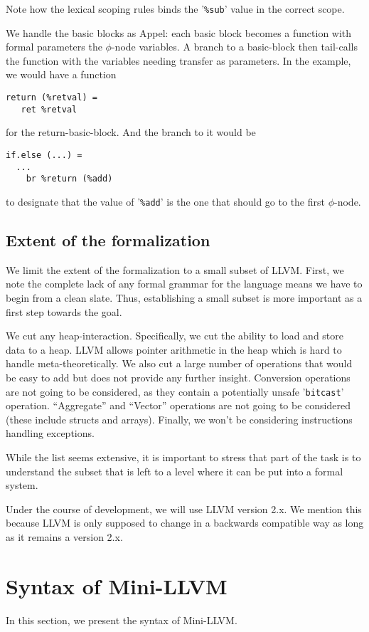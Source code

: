 \documentclass[a4paper, oneside, 10pt, draft]{memoir}
\begin{document}
Note how the lexical scoping rules binds the '\texttt{\%sub}' value
in the correct scope.

We handle the basic blocks as Appel: each basic block becomes a
function with formal parameters the $\phi$-node variables. A branch to
a basic-block then tail-calls the function with the variables needing
transfer as parameters. In the example, we would have a function
\begin{verbatim}
return (%retval) =
   ret %retval
\end{verbatim}
for the return-basic-block. And the branch to it would be
\begin{verbatim}
if.else (...) =
  ...
    br %return (%add)
\end{verbatim}
to designate that the value of '\texttt{\%add}' is the one that should
go to the first $\phi$-node.

\section{Extent of the formalization}

We limit the extent of the formalization to a small subset of
LLVM. First, we note the complete lack of any formal grammar for
the language means we have to begin from a clean slate. Thus,
establishing a small subset is more important as a first step towards
the goal.

We cut any heap-interaction. Specifically, we cut the ability to
load and store data to a heap. LLVM allows pointer arithmetic in the
heap which is hard to handle meta-theoretically. We also cut a large
number of operations that would be easy to add but does not provide
any further insight. Conversion operations are not going to be
considered, as they contain a potentially unsafe '\texttt{bitcast}'
operation. ``Aggregate'' and ``Vector'' operations are not going to be
considered (these include structs and arrays). Finally, we won't be
considering instructions handling exceptions.

While the list seems extensive, it is important to stress that part of
the task is to understand the subset that is left to a level where it
can be put into a formal system.

Under the course of development, we will use LLVM version 2.x. We
mention this because LLVM is only supposed to change in a backwards
compatible way as long as it remains a version 2.x.

\chapter{Syntax of Mini-LLVM}

In this section, we present the syntax of Mini-LLVM.



\end{document}
